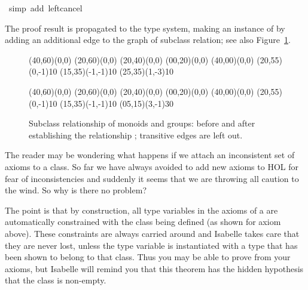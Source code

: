 \begin{isabellebody}
\ {}simp\ add{}\ left{}cancel{}\isanewline
{}\isamarkupfalse%
%
\endisatagproof
{\isafoldproof}%
%
\isadelimproof
%
\endisadelimproof
%
\begin{isamarkuptext}%
\noindent The proof result is propagated to the type system,
making  an instance of  by adding an
additional edge to the graph of subclass relation; see also
Figure~\ref{fig:subclass}.

\begin{figure}[htbp]
 \begin{center}
   \small
   \unitlength 0.6mm
   \begin{picture}(40,60)(0,0)
     \put(20,60){\makebox(0,0){}}
     \put(20,40){\makebox(0,0){}}
     \put(00,20){\makebox(0,0){}}
     \put(40,00){\makebox(0,0){}}
     \put(20,55){\vector(0,-1){10}}
     \put(15,35){\vector(-1,-1){10}}
     \put(25,35){\vector(1,-3){10}}
   \end{picture}
   \hspace{8em}
   \begin{picture}(40,60)(0,0)
     \put(20,60){\makebox(0,0){}}
     \put(20,40){\makebox(0,0){}}
     \put(00,20){\makebox(0,0){}}
     \put(40,00){\makebox(0,0){}}
     \put(20,55){\vector(0,-1){10}}
     \put(15,35){\vector(-1,-1){10}}
     \put(05,15){\vector(3,-1){30}}
   \end{picture}
   \caption{Subclass relationship of monoids and groups:
      before and after establishing the relationship
      ;  transitive edges are left out.}
   \label{fig:subclass}
 \end{center}
\end{figure}%
\end{isamarkuptext}%
\isamarkuptrue%
%
\isamarkuptrue%
%
\begin{isamarkuptext}%
The reader may be wondering what happens if we attach an
inconsistent set of axioms to a class. So far we have always avoided
to add new axioms to HOL for fear of inconsistencies and suddenly it
seems that we are throwing all caution to the wind. So why is there no
problem?

The point is that by construction, all type variables in the axioms of
a  are automatically constrained with the class
being defined (as shown for axiom  above). These
constraints are always carried around and Isabelle takes care that
they are never lost, unless the type variable is instantiated with a
type that has been shown to belong to that class. Thus you may be able
to prove  from your axioms, but Isabelle will remind you
that this theorem has the hidden hypothesis that the class is
non-empty.


\end{isamarkuptext}
\end{isabellebody}

